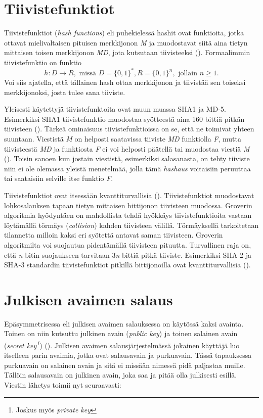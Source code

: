  \section{Tiivistefunktiot}
 Tiivistefunktiot (\emph{hash functions}) eli puhekielessä hashit  ovat funktioita, jotka ottavat mielivaltaisen pituisen merkkijonon \emph{M} ja muodostavat siitä aina tietyn mittaisen toisen merkkijonon \emph{MD}, jota kutsutaan tiivisteeksi (\cite{sobti2012cryptographic}). Formaalimmin tiivistefunktio on funktio
 \[h: D \to R, \text{ missä } D = \big\{0,1\big\}^{*}, R = \big\{0,1\big\}^{n}, \text{ jollain } n \geq 1.\] Voi siis ajatella, että tällainen hash ottaa merkkijonon ja tiivistää sen toiseksi merkkijonoksi, josta tulee sana tiiviste.
 
 Yleisesti käytettyjä tiivistefunktoita ovat muun muassa SHA1 ja MD-5. Esimerkiksi SHA1 tiivistefunktio muodostaa syötteestä aina 160 bittiä pitkän tiivisteen (\cite{bellare2005introduction}). Tärkeä ominaisuus tiivistefunktioissa on se, että ne toimivat yhteen suuntaan. Viestistä \emph{M} on helposti saatavissa tiiviste \emph{MD} funktiolla \emph{F}, mutta tiivisteestä \emph{MD} ja funktiosta \emph{F} ei voi helposti päätellä tai muodostaa viestiä \emph{M} (\cite{bakhtiari1995cryptographic}). Toisin sanoen kun jostain viestistä, esimerkiksi salasanasta, on tehty tiiviste niin ei ole olemassa yleistä menetelmää, jolla tämä \emph{hashaus} voitaisiin peruuttaa tai saataisiin selville itse funktio \emph{F}.
 
 Tiivistefunktiot ovat itsessään kvanttiturvallisia (\cite{mavroeidis2018impact}). Tiivistefunktiot muodostavat lohkosalauksen tapaan tietyn mittaisen bittijonon tiivisteen muodossa. Groverin algoritmia hyödyntäen on mahdollista tehdä hyökkäys tiivistefunktioita vastaan löytämällä törmäys (\emph{collision}) kahden tiivisteen välillä. Törmäyksellä tarkoitetaan tilannetta milloin kaksi eri syötettä antavat saman tiivisteen. Groverin algoritmilta voi suojautua pidentämällä tiivisteen pituutta. Turvallinen raja on, että \emph{n}-bitin suojaukseen tarvitaan 3\emph{n}-bittiä pitkä tiiviste. Esimerkiksi SHA-2 ja SHA-3 standardin tiivistefunktiot pitkillä bittijonoilla ovat kvanttiturvallisia (\cite{mavroeidis2018impact}).
 
 \section{Julkisen avaimen salaus}
 Epäsymmetrisessa eli julkisen avaimen salauksessa on käytössä kaksi avainta. Toinen on niin kutsuttu julkinen avain (\emph{public key}) ja toinen salainen avain (\emph{secret key\footnote{Joskus myös \emph{private key}}}) (\cite{bellare2005introduction}). Julkisen avaimen salausjärjestelmässä jokainen käyttäjä luo itselleen parin avaimia, jotka ovat salausavain ja purkuavain. Tässä tapauksessa purkuavain on salainen avain ja sitä ei missään nimessä pidä paljastaa muille. Tällöin salausavain on julkinen avain, joka saa ja pitää olla julkisesti esillä. Viestin lähetys toimii nyt seuraavasti:
 
